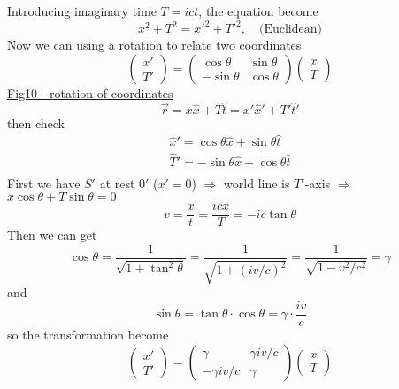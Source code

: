 \documentclass[12pt]{article}
\begin{document}
Introducing imaginary time $T = ict$, the equation become 
\begin{equation}
x^2+T^2 = x'^2 + T'^2,\quad \text{(Euclidean)}
\end{equation}
Now we can using a rotation to relate two coordinates
\begin{equation}
\begin{pmatrix}
x' \\ T'
\end{pmatrix}
=
\begin{pmatrix}
\cos\theta & \sin\theta \\
-\sin\theta & \cos\theta
\end{pmatrix}\begin{pmatrix}
x \\ T
\end{pmatrix}
\end{equation}
\underline{Fig10 - rotation of coordinates}
\begin{equation}
\vec{r} = x\hat{x} + T\hat{t} = x' \hat{x}' + T' \hat{t}'
\end{equation}
then check
\begin{equation}
\begin{aligned}
\hat{x}' = \cos\theta \hat{x} + \sin \theta \hat{t}\\
\hat{T}' = -\sin\theta \hat{x} + \cos \theta \hat{t}\\
\end{aligned}
\end{equation}
First we have $S'$ at rest $0'$ ($x'=0$) $\Rightarrow$ world line is $T'$-axis  $\Rightarrow$ $x\cos\theta + T\sin\theta=0$
\begin{equation}
v = \frac{x}{t} = \frac{icx}{T} = -ic\tan\theta
\end{equation}
Then we can get
\begin{equation}
\cos \theta = \frac{1}{\sqrt{1+\tan^2\theta}} = \frac{1}{\sqrt{1+(iv/c)^2}} = \frac{1}{\sqrt{1-v^2/{c^2}}} = \gamma
\end{equation}
and 
\begin{equation}
\sin \theta = \tan\theta \cdot \cos\theta = \gamma \cdot \frac{iv}{c}
\end{equation}
so the transformation become
\begin{equation}
\begin{pmatrix}
x' \\ T'
\end{pmatrix}
=
\begin{pmatrix}
\gamma & \gamma iv/c \\
-\gamma iv/c  & \gamma
\end{pmatrix}\begin{pmatrix}
x \\ T
\end{pmatrix}
\end{equation}
\end{document}
